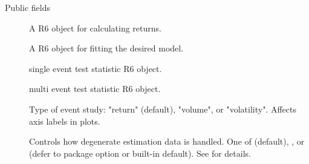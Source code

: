 \documentclass[a4paper]{book}
\begin{document}
%
\begin{Section}{Public fields}

\begin{description}

\item[] A R6 object for calculating returns.

\item[] A R6 object for fitting the desired model.

\item[] single event test statistic R6 object.

\item[] multi event test statistic R6 object.

\item[] Type of event study: "return" (default),
"volume", or "volatility". Affects axis labels in plots.

\item[] Controls how degenerate estimation data
is handled. One of  (default), ,
or  (defer to package option or built-in default).
See  for details.

\end{description}


\end{Section}
%
\end{document}
